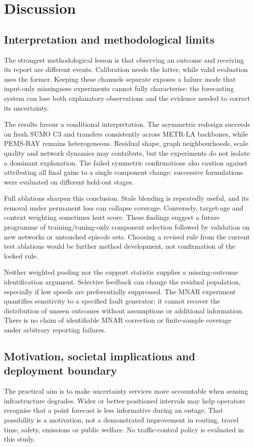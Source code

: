 \section{Discussion}\label{sec:discussion}

\subsection{Interpretation and methodological limits}
The strongest methodological lesson is that observing an outcome and receiving its report are different events. Calibration needs the latter, while valid evaluation uses the former. Keeping these channels separate exposes a failure mode that input-only missingness experiments cannot fully characterise: the forecasting system can lose both explanatory observations and the evidence needed to correct its uncertainty.

The results favour a conditional interpretation. The asymmetric redesign succeeds on fresh SUMO C3 and transfers consistently across METR-LA backbones, while PEMS-BAY remains heterogeneous. Residual shape, graph neighbourhoods, scale quality and network dynamics may contribute, but the experiments do not isolate a dominant explanation. The failed symmetric confirmations also caution against attributing all final gains to a single component change: successive formulations were evaluated on different held-out stages.

Full ablations sharpen this conclusion. Stale blending is repeatedly useful, and its removal under permanent loss can collapse coverage. Conversely, target-age and context weighting sometimes hurt score. These findings suggest a future programme of training/tuning-only component selection followed by validation on new networks or untouched episode sets. Choosing a revised rule from the current test ablations would be further method development, not confirmation of the locked rule.

Neither weighted pooling nor the support statistic supplies a missing-outcome identification argument. Selective feedback can change the residual population, especially if low speeds are preferentially suppressed. The MNAR experiment quantifies sensitivity to a specified fault generator; it cannot recover the distribution of unseen outcomes without assumptions or additional information. There is no claim of identifiable MNAR correction or finite-sample coverage under arbitrary reporting failures.

\subsection{Motivation, societal implications and deployment boundary}
The practical aim is to make uncertainty services more accountable when sensing infrastructure degrades. Wider or better-positioned intervals may help operators recognise that a point forecast is less informative during an outage. That possibility is a motivation, not a demonstrated improvement in routing, travel time, safety, emissions or public welfare. No traffic-control policy is evaluated in this study.

